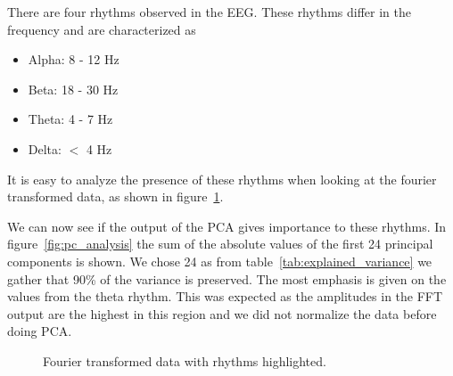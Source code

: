 There are four rhythms observed in the EEG\cite[chapter~11]{Ganong1997}. These rhythms differ in the frequency and are characterized as

\begin{itemize}
	\item Alpha: 8 - 12 Hz
	\item Beta: 18 - 30 Hz
	\item Theta: 4 - 7 Hz
	\item Delta: $<$ 4 Hz
\end{itemize}

It is easy to analyze the presence of these rhythms when looking at the fourier transformed data, as shown in figure~\ref{fig:eeg_with_rhythm}.

We can now see if the output of the PCA gives importance to these rhythms. In figure~\ref{fig:pc_analysis} the sum of the absolute values of the first 24 principal components is shown. We chose 24 as from table~\ref{tab:explained_variance} we gather that 90\% of the variance is preserved. The most emphasis is given on the values from the theta rhythm. This was expected as the amplitudes in the FFT output are the highest in this region and we did not normalize the data before doing PCA.


\newpage
\begin{figure}
	\centering	
	
	\caption{Fourier transformed data with rhythms highlighted.}
	\label{fig:eeg_with_rhythm}
\end{figure}


